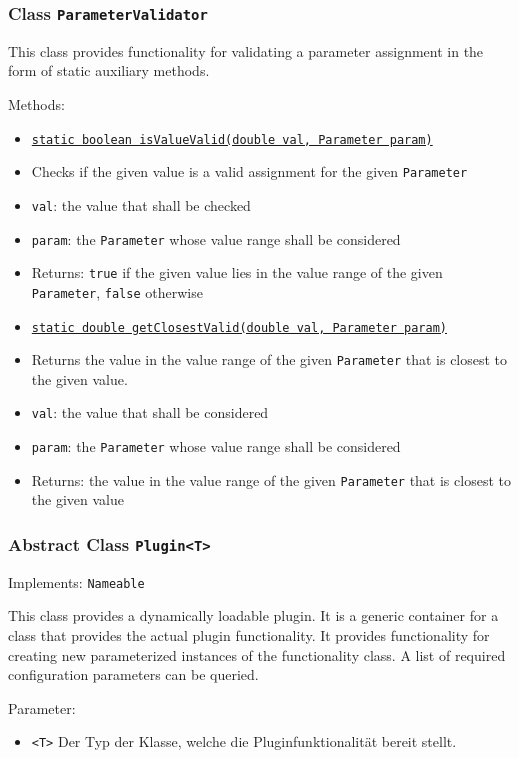 \documentclass[parskip=full,11pt]{scrartcl}
\begin{document}
\subsubsection{Class \texttt{ParameterValidator}}

This class provides functionality for validating a parameter assignment in the form of static auxiliary methods.

Methods:

\begin{itemize} \itemsep -10pt
	\item \underline{\texttt{static boolean isValueValid(double val, Parameter param)}}
	\item[] Checks if the given value is a valid assignment for the given \texttt{Parameter}
	\item[] \texttt{val}: the value that shall be checked
	\item[] \texttt{param}: the \texttt{Parameter} whose value range shall be considered
	\item[] Returns: \texttt{true} if the given value lies in the value range of the given \texttt{Parameter}, \texttt{false} otherwise
	\item \underline{\texttt{static double getClosestValid(double val, Parameter param)}}
	\item[] Returns the value in the value range of the given \texttt{Parameter} that is closest to the given value.
	\item[] \texttt{val}: the value that shall be considered
	\item[] \texttt{param}: the \texttt{Parameter} whose value range shall be considered
	\item[] Returns: the value in the value range of the given \texttt{Parameter} that is closest to the given value
\end{itemize}

\subsubsection{Abstract Class \texttt{Plugin<T>}}
Implements: \texttt{Nameable}

This class provides a dynamically loadable plugin. It is a generic container for a class that provides the actual plugin functionality. It provides functionality for creating new parameterized instances of the functionality class. A list of required configuration parameters can be queried.

Parameter:
\begin{itemize}\itemsep -10pt
	\item \texttt{<T>} Der Typ der Klasse, welche die Pluginfunktionalität bereit stellt. 
\end{itemize}
\end{document}
